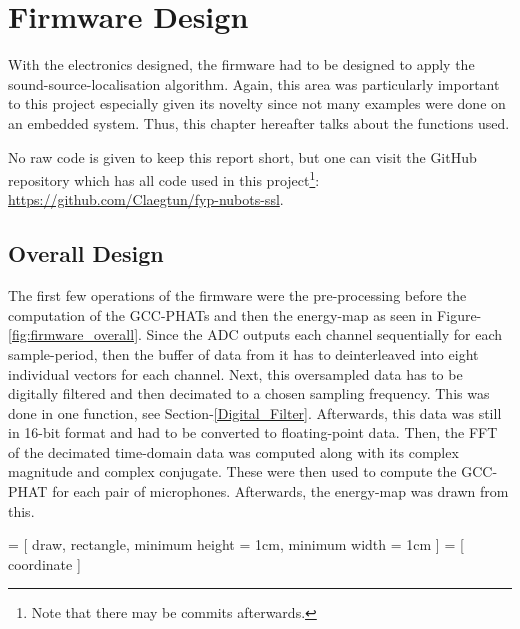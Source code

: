 \documentclass[notitlepage]{report}
\begin{document}
\chapter{Firmware Design}

With the electronics designed, the firmware had to be designed to apply the sound-source-localisation algorithm. Again, this area was particularly important to this project especially given its novelty since not many examples were done on an embedded system. Thus, this chapter hereafter talks about the functions used. 

No raw code is given to keep this report short, but one can visit the GitHub repository which has all code used in this project\footnote{Note that there may be commits afterwards.}: \url{https://github.com/Claegtun/fyp-nubots-ssl}.

\section{Overall Design}

The first few operations of the firmware were the pre-processing before the computation of the GCC-PHATs and then the energy-map as seen in Figure-\ref{fig:firmware_overall}. Since the ADC outputs each channel sequentially for each sample-period, then the buffer of data from it has to deinterleaved into eight individual vectors for each channel. Next, this oversampled data has to be digitally filtered and then decimated to a chosen sampling frequency. This was done in one function, see Section-\ref{Digital_Filter}. Afterwards, this data was still in 16-bit format and had to be converted to floating-point data. Then, the FFT of the decimated time-domain data was computed along with its complex magnitude and complex conjugate. These were then used to compute the GCC-PHAT for each pair of microphones. Afterwards, the energy-map was drawn from this.

 = [
	draw, 
	rectangle, 
	minimum height = 1cm, 
	minimum width = 1cm
]
 = [
	coordinate
]
\end{document}

